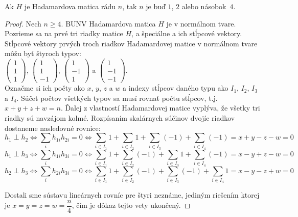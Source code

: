 \begin{theorem}
\label{th:hadam_4}
Ak $H$ je Hadamardova matica rádu $n$, tak $n$ je buď $1$, $2$ alebo násobok~$4$. 
\end{theorem}
\begin{toreview}
\begin{proof}
Nech $n \geq 4$.
BUNV Hadamardova matica $H$ je v normálnom tvare.  
Pozrieme sa na prvé tri riadky matice $H$, a špeciálne a ich stĺpcové vektory.
Stĺpcové vektory prvých troch riadkov Hadamardovej matice v normálnom tvare môžu byť štyroch typov:\\ $\begin{pmatrix}1\\1\\1\end{pmatrix}$, 
$\begin{pmatrix}1\\1\\-1\end{pmatrix}$, 
$\begin{pmatrix}1\\-1\\1\end{pmatrix}$
a
$\begin{pmatrix}1\\-1\\-1\end{pmatrix}$.\\
Označme si ich počty ako $x$, $y$, $z$ a $w$ a indexy stĺpcov daného typu ako $I_1$, $I_2$, $I_3$ a  $I_4$. Súčet počtov všetkých typov sa musí rovnať počtu stĺpcov, t.j. $x + y + z + w = n$. Ďalej z vlastností Hadamardovej matice vyplýva, že všetky tri riadky sú navzájom kolmé.
Rozpísaním skalárnych súčinov dvojíc riadkov dostaneme nasledovné rovnice:
$$ h_1 \perp h_2 \Longleftrightarrow \sum_i h_{1 i} h_{2 i} = 0 \Longleftrightarrow \sum_{i \in I_1} 1 + \sum_{i \in I_2}1 + \sum_{i \in I_3}(-1) + \sum_{i \in I_4} (-1) = x + y - z - w = 0 $$ 
$$ h_1 \perp h_3 \Longleftrightarrow \sum_i h_{1 i} h_{3 i} = 0 \Longleftrightarrow \sum_{i \in I_1} 1 + \sum_{i \in I_2}(-1) + \sum_{i \in I_3}1 + \sum_{i \in I_4} (-1) = x - y + z - w = 0 $$ 
$$ h_2 \perp h_3 \Longleftrightarrow \sum_i h_{2 i} h_{3 i} = 0 \Longleftrightarrow \sum_{i \in I_1} 1 + \sum_{i \in I_2}(-1) + \sum_{i \in I_3}(-1) + \sum_{i \in I_4} 1 = x - y - z + w = 0 $$ 

Dostali sme sústavu lineárnych rovníc pre štyri neznáme, jediným riešením ktorej je $x = y = z = w = \dfrac{n}{4}$, čím je dôkaz tejto vety ukončený.
\end{proof}
\end{toreview}

